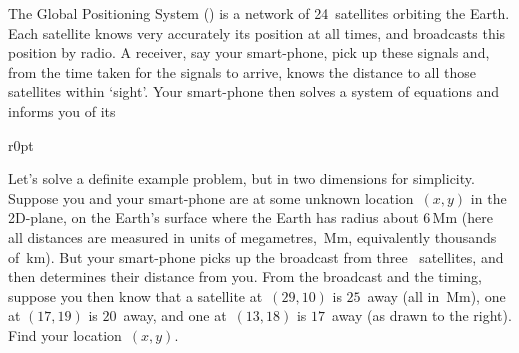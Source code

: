 \begin{example} \label{eg:gps2}
The Global Positioning System (\gps) is a network of 24~satellites orbiting the Earth.
Each satellite knows very accurately its position at all times, and broadcasts this position by radio.
A receiver, say your smart-phone, pick up these signals and, from the time taken for the signals to arrive, knows the distance to all those satellites within `sight'.
Your smart-phone then solves a system of equations and informs you of its 

\begin{wrapfigure}r{0pt}
\end{wrapfigure}
Let's solve a definite example problem, but in two dimensions for simplicity.
Suppose you and your smart-phone are at some unknown location~\((x,y)\) in the 2D-plane, on the Earth's surface where the Earth has radius about \(6\)\,Mm (here all distances are measured in units of megametres,~Mm, equivalently thousands of~km).
But your smart-phone picks up the broadcast from three \gps\ satellites, and then determines their distance from you.
From the broadcast and the timing, suppose you then know that a satellite at~\((29,10)\) is \(25\)~away (all in~Mm), one at \((17,19)\) is \(20\)~away, and one at~\((13,18)\) is \(17\)~away (as drawn to the right).
Find your location~\((x,y)\).



\end{example}
